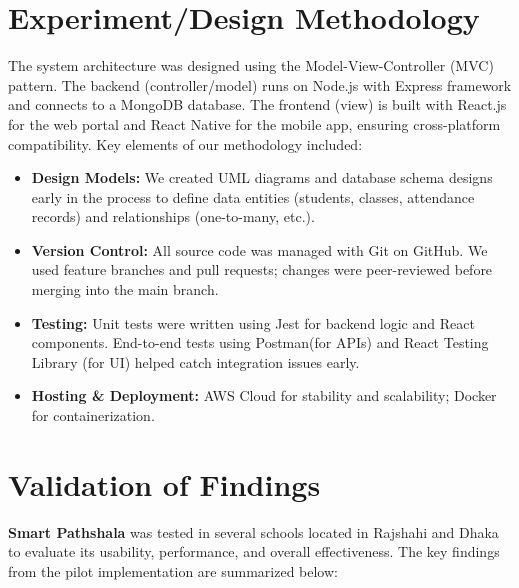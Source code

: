 \documentclass[12pt,a4paper]{report}
\newcommand{\project}[1]{\textcolor{projectcolor}{\textbf{#1}}}
\let\oldcite\cite
\renewcommand{\cite}[1]{\textcolor{impactcolor}{\oldcite{#1}}}
\newenvironment{coloritemize}
{\begin{itemize}[label=\textcolor{primaryblue}{$\bullet$}]}
{\end{itemize}}
\begin{document}
\section{Experiment/Design Methodology}
The system architecture was designed using the Model-View-Controller (MVC) pattern. The backend (controller/model) runs on Node.js \cite{ref5} with Express framework and connects to a MongoDB database. The frontend (view) is built with React.js \cite{ref3} for the web portal and React Native for the mobile app, ensuring cross-platform compatibility. Key elements of our methodology included:
\begin{coloritemize}
    \item \textcolor{secondaryblue}{\textbf{Design Models:}} We created UML diagrams and database schema designs early in the process to define data entities (students, classes, attendance records) and relationships (one-to-many, etc.).
    \item \textcolor{secondaryblue}{\textbf{Version Control:}} All source code was managed with Git on GitHub. We used feature branches and pull requests; changes were peer-reviewed before merging into the main branch.
    \item \textcolor{secondaryblue}{\textbf{Testing:}} Unit tests were written using Jest for backend logic and React components. End-to-end tests using Postman(for APIs) and React Testing Library (for UI) helped catch integration issues early. 
    \item \textcolor{secondaryblue}{\textbf{Hosting \& Deployment:}} AWS \cite{ref7} Cloud for stability and scalability; Docker for containerization.
\end{coloritemize}

\newpage
\section{Validation of Findings}
\label{sec:validation}
\project{Smart Pathshala} was tested in several schools located in Rajshahi and Dhaka to evaluate its usability, performance, and overall effectiveness. The key findings from the pilot implementation are summarized below:
\end{document}
